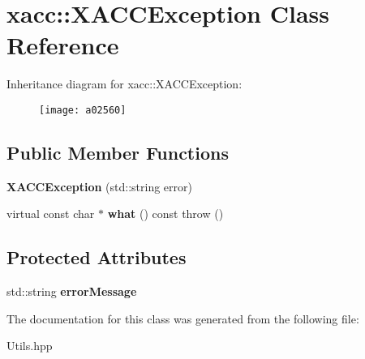 \hypertarget{a02560}{}\section{xacc\+:\+:X\+A\+C\+C\+Exception Class Reference}
\label{a02560}
Inheritance diagram for xacc\+:\+:X\+A\+C\+C\+Exception\+:\begin{figure}[H]
\begin{center}
\leavevmode
\texttt{[image: a02560]}
\end{center}
\end{figure}
\subsection*{Public Member Functions}
\begin{DoxyCompactItemize}
\item 
\mbox{\label{a02560_ab62415ce6e1dd25fb1a074f5741007c9}} 
{\bfseries X\+A\+C\+C\+Exception} (std\+::string error)
\item 
\mbox{\label{a02560_a86612df9215beec1933229c5dddc12e5}} 
virtual const char $\ast$ {\bfseries what} () const  throw ()
\end{DoxyCompactItemize}
\subsection*{Protected Attributes}
\begin{DoxyCompactItemize}
\item 
\mbox{\label{a02560_a31f64c6fb215570571b9b4a3d47eadd0}} 
std\+::string {\bfseries error\+Message}
\end{DoxyCompactItemize}


The documentation for this class was generated from the following file\+:\begin{DoxyCompactItemize}
\item 
Utils.\+hpp\end{DoxyCompactItemize}
